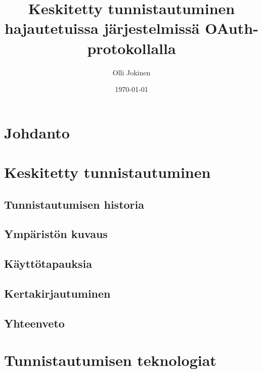 \documentclass{tktltiki}
\begin{document}
\title{Keskitetty tunnistautuminen hajautetuissa järjestelmissä OAuth-protokollalla}
\author{Olli Jokinen}
\date{\today}
\maketitle
\doublespacing
{}
\subject{Tietojenkäsittelytiede}
\additionalinformation{}
\begin{abstract}

\end{abstract}
\mytableofcontents
\section{Johdanto}

\section{Keskitetty tunnistautuminen}

\subsection{Tunnistautumisen historia}

\subsection{Ympäristön kuvaus}

\subsection{Käyttötapauksia}

\subsection{Kertakirjautuminen}

\subsection{Yhteenveto}

\section{Tunnistautumisen teknologiat}

\end{document}
